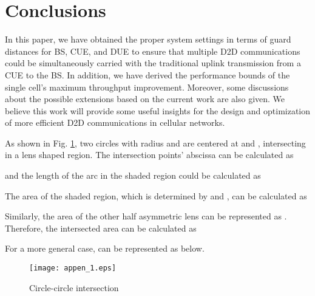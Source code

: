 \documentclass[journal, 10pt]{IEEEtran}
\begin{document}
\section{Conclusions}\label{sec:con} 

In this paper, we have obtained the proper system settings in terms of
guard distances for BS, CUE, and DUE to ensure that multiple D2D
communications could be simultaneously carried with the traditional
uplink transmission from a CUE to the BS. In addition, we have derived
the performance bounds of the single cell's maximum throughput
improvement. Moreover, some discussions about the possible extensions
based on the current work are also given. We believe this work will
provide some useful insights for the design and optimization of more
efficient D2D communications in cellular networks. 



\appendix \label{ap:intersection} 

As shown in Fig. \ref{fig:app_1}, two circles with radius  and 
are centered at  and , intersecting in a lens shaped
region. The intersection points' abscissa can be calculated as

and the length of the arc in the shaded region could be calculated as

The area of the shaded region, which is determined by  and , can be 
calculated as

Similarly, the area of the other half asymmetric lens can be represented as 
. Therefore, the intersected area can be calculated as
\setlength{\arraycolsep}{0.0em}

\setlength{\arraycolsep}{5pt}
For a more general case,  can be represented as below.

\begin{figure}[!htb]
\centering 
\texttt{[image: appen\_1.eps]} 
\caption{Circle-circle intersection} \label{fig:app_1} 
\end{figure}
\end{document}
